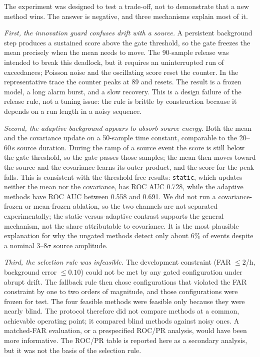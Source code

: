 \documentclass[11pt]{article}
\begin{document}
The experiment was designed to test a trade-off, not to demonstrate that a new method wins. The answer is negative, and three mechanisms explain most of it.

\emph{First, the innovation guard confuses drift with a source.} A persistent background step produces a sustained score above the gate threshold, so the gate freezes the mean precisely when the mean needs to move. The 90-sample release was intended to break this deadlock, but it requires an uninterrupted run of exceedances; Poisson noise and the oscillating score reset the counter. In the representative trace the counter peaks at 89 and resets. The result is a frozen model, a long alarm burst, and a slow recovery. This is a design failure of the release rule, not a tuning issue: the rule is brittle by construction because it depends on a run length in a noisy sequence.

\emph{Second, the adaptive background appears to absorb source energy.} Both the mean and the covariance update on a 50-sample time constant, comparable to the 20--60\,s source duration. During the ramp of a source event the score is still below the gate threshold, so the gate passes those samples; the mean then moves toward the source and the covariance learns its outer product, and the score for the peak falls. This is consistent with the threshold-free results: \texttt{static}, which updates neither the mean nor the covariance, has ROC AUC 0.728, while the adaptive methods have ROC AUC between 0.558 and 0.691. We did not run a covariance-frozen or mean-frozen ablation, so the two channels are not separated experimentally; the static-versus-adaptive contrast supports the general mechanism, not the share attributable to covariance. It is the most plausible explanation for why the ungated methods detect only about 6\% of events despite a nominal 3--8$\sigma$ source amplitude.

\emph{Third, the selection rule was infeasible.} The development constraint (FAR $\le 2$/h, background error $\le 0.10$) could not be met by any gated configuration under abrupt drift. The fallback rule then chose configurations that violated the FAR constraint by one to two orders of magnitude, and those configurations were frozen for test. The four feasible methods were feasible only because they were nearly blind. The protocol therefore did not compare methods at a common, achievable operating point; it compared blind methods against noisy ones. A matched-FAR evaluation, or a prespecified ROC/PR analysis, would have been more informative. The ROC/PR table is reported here as a secondary analysis, but it was not the basis of the selection rule.
\end{document}
